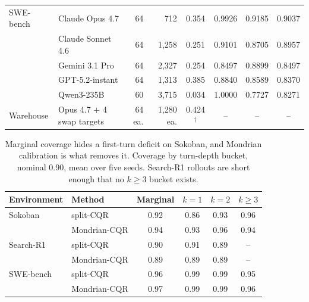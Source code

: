 \documentclass{article}
\begin{document}
\begin{table}[t]
\begin{tabular}{llrrcccc}
    \midrule
    SWE-bench & Claude Opus 4.7 & 64 & 712 & 0.354 & 0.9926 & 0.9185 & 0.9037 \\
     & Claude Sonnet 4.6 & 64 & 1{,}258 & 0.251 & 0.9101 & 0.8705 & 0.8957 \\
     & Gemini 3.1 Pro & 64 & 2{,}327 & 0.254 & 0.8497 & 0.8899 & 0.8497 \\
     & GPT-5.2-instant & 64 & 1{,}313 & 0.385 & 0.8840 & 0.8589 & 0.8370 \\
     & Qwen3-235B & 60 & 3{,}715 & 0.034 & 1.0000 & 0.7727 & 0.8271 \\
    \midrule
    Warehouse & Opus 4.7 $+$ 4 swap targets & 64 ea. & 1{,}280 ea. & 0.424$^{\dagger}$ & -- & -- & -- \\
    \bottomrule
  \end{tabular}
\end{table}

\begin{table}[t]
  \caption{Marginal coverage hides a first-turn deficit on Sokoban, and Mondrian
  calibration is what removes it. Coverage by turn-depth bucket, nominal 0.90, mean over five seeds. Search-R1
  rollouts are short enough that no $k{\geq}3$ bucket exists.}
  \label{tab:b2}
  \centering
  \small
  \begin{tabular}{llcccc}
    \toprule
    Environment & Method & Marginal & $k{=}1$ & $k{=}2$ & $k{\geq}3$ \\
    \midrule
    Sokoban & split-CQR & 0.92 & 0.86 & 0.93 & 0.96 \\
     & Mondrian-CQR & 0.94 & 0.93 & 0.96 & 0.94 \\
    \midrule
    Search-R1 & split-CQR & 0.90 & 0.91 & 0.89 & -- \\
     & Mondrian-CQR & 0.89 & 0.89 & 0.89 & -- \\
    \midrule
    SWE-bench & split-CQR & 0.96 & 0.99 & 0.99 & 0.95 \\
     & Mondrian-CQR & 0.97 & 0.99 & 0.99 & 0.96 \\
    \bottomrule
  \end{tabular}
\end{table}
\end{document}
